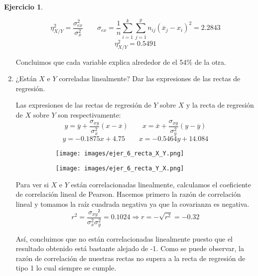 \documentclass[a4paper, 12pt]{article}
\theoremstyle{definition}
\newtheorem{ej}{Ejercicio}
\begin{document}
\begin{ej}
\begin{enumerate}[label=\alph*)]
\[
	\eta_{X/Y}^2 = \frac{\sigma_{ex}^2}{\sigma_x^2} \qquad \sigma_{ex} = \frac{1}{n} \sum_{i=1}^{k} \sum_{j=1}^{p} n_{ij} (\overline{x}_j - x_i)^2 = 2.2843
\]
\[
	\eta_{X/Y}^2 = 0.5491
\]

Concluimos que cada variable explica alrededor de el 54\% de la otra.

	\item ¿Están \(X\) e \(Y\) correladas linealmente? Dar las expresiones de las rectas de regresión.
	
Las expresiones de las rectas de regresión de \(Y\) sobre \(X\) y la recta de regresión de \(X\) sobre \(Y\) son respectivamente:
\[
	y = \overline{y} + \frac{\sigma_{xy}}{\sigma_x^2} (x - \overline{x}) \qquad x  = \overline{x} + \frac{\sigma_{xy}}{\sigma_y^2} (y - \overline{y})
\]
\[
	y = -0.1875x + 4.75 \qquad x = -0.5464y + 14.084
\]

\newpage

    \begin{figure}[h!]
        \centering
        \begin{subfigure}[b]{0.45\linewidth}
        \texttt{[image: images/ejer\_6\_recta\_X\_Y.png]}
        \end{subfigure}
        \begin{subfigure}[b]{0.45\linewidth}
        \texttt{[image: images/ejer\_6\_recta\_Y\_X.png]}
        \end{subfigure}
    \end{figure}
    
Para ver si \(X\) e \(Y\) están  correlacionadas linealmente, calculamos el coeficiente de correlación lineal de Pearson. Hacemos primero la razón de correlación lineal y tomamos la raíz cuadrada negativa ya que la covarianza es negativa.
\[
	r^2 = \frac{\sigma_{xy}²}{\sigma_x^2 \sigma_y^2} = 0.1024 \Rightarrow r = -\sqrt{r^2} = -0.32
\]

Así, concluimos que no están correlacionadas linealmente puesto que el resultado obtenido está bastante alejado de -1. Como se puede observar, la razón de correlación de nuestras rectas no supera a la recta de regresión de tipo 1 lo cual siempre se cumple.
\end{enumerate}

\end{ej}
\end{document}
